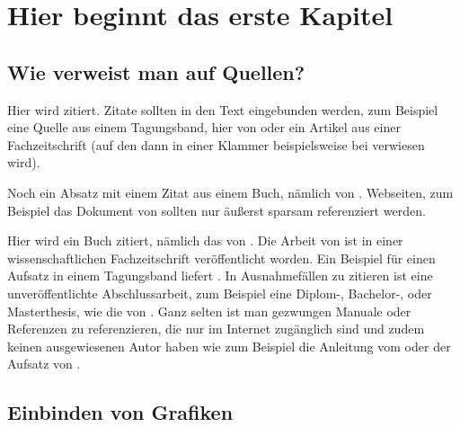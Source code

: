 \documentclass[12pt,a4paper%
              ,twoside     %
              ,titlepage
              ,DIV=13
              ,headinclude
              ,footinclude=false%
              ,cleardoublepage=empty%
              ,parskip=half,
              ]{scrreprt}
\begin{document}
\selectlanguage{\thesisLanguage}

\setcounter{page}{1}

\THAtitlepage

\tableofcontents


\setcounter{page}{1}

\chapter{Hier beginnt das erste Kapitel}

\section{Wie verweist man auf Quellen?}

Hier wird \citet{Neumann:1977} zitiert. Zitate sollten in den Text eingebunden werden, zum Beispiel eine Quelle aus einem Tagungsband, hier von \citet{Bauer} oder ein Artikel aus einer Fachzeitschrift (auf den dann in einer Klammer beispielsweise bei \cite{Fox:2002} verwiesen wird). 

Noch ein Absatz mit einem Zitat aus einem Buch, nämlich von \citet{R:Chambers:1998}. Webseiten, zum Beispiel das Dokument von \citet{xmlComparingSchemata} sollten nur äußerst sparsam referenziert werden. 

Hier wird ein Buch zitiert, nämlich das von \citet{darwin}. Die Arbeit von \citet{meulman} ist in einer wissenschaftlichen Fachzeitschrift veröffentlicht worden. Ein Beispiel für einen Aufsatz in einem Tagungsband liefert \citet{banzhaf96effect}. In Ausnahmefällen zu zitieren ist eine unveröffentlichte Abschlussarbeit, zum Beispiel eine Diplom-, Bachelor-, oder Masterthesis, wie die von \citet{holzheuer}. Ganz selten ist man gezwungen Manuale oder Referenzen zu referenzieren, die nur im Internet zugänglich sind und zudem keinen ausgewiesenen Autor haben wie zum Beispiel die Anleitung vom \citet{hornik} oder der Aufsatz von \citet{xmlComparingSchemata}.

\section{Einbinden von Grafiken}
\end{document}
